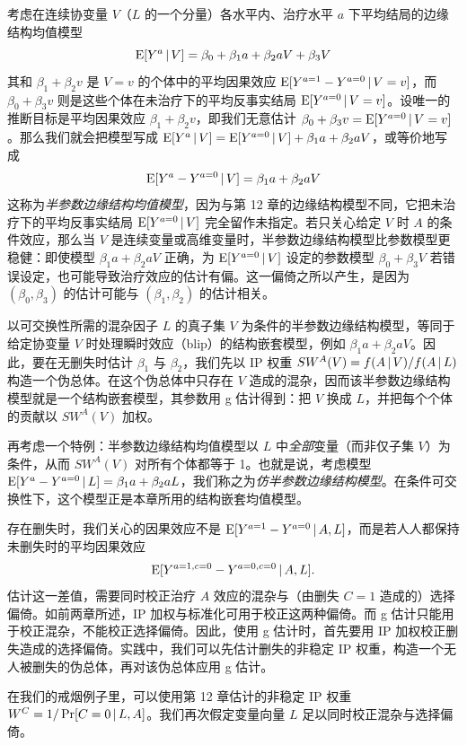 \begin{finepoint}[边缘结构模型与结构嵌套模型的关系]
考虑在连续协变量 $V$（$L$ 的一个分量）各水平内、治疗水平 $a$ 下平均结局的边缘结构均值模型
\[
\mathrm{E}[Y^a\,|\, V]=\beta_0+\beta_1a+\beta_2aV+\beta_3V
\]
其和 $\beta_1+\beta_2v$ 是 $V=v$ 的个体中的平均因果效应 $\mathrm{E}[Y^{a=1}-Y^{a=0}\,|\, V=v]$，而 $\beta_0+\beta_3v$ 则是这些个体在未治疗下的平均反事实结局 $\mathrm{E}[Y^{a=0}\,|\, V=v]$。设唯一的推断目标是平均因果效应 $\beta_1+\beta_2v$，即我们无意估计 $\beta_0+\beta_3v=\mathrm{E}[Y^{a=0}\,|\, V=v]$。那么我们就会把模型写成 $\mathrm{E}[Y^a\,|\, V]=\mathrm{E}[Y^{a=0}\,|\, V]+\beta_1a+\beta_2aV$，或等价地写成
\[
\mathrm{E}[Y^a-Y^{a=0}\,|\, V]=\beta_1a+\beta_2aV
\]
这称为\emph{半参数边缘结构均值模型}，因为与第 12 章的边缘结构模型不同，它把未治疗下的平均反事实结局 $\mathrm{E}[Y^{a=0}\,|\, V]$ 完全留作未指定。若只关心给定 $V$ 时 $A$ 的条件效应，那么当 $V$ 是连续变量或高维变量时，半参数边缘结构模型比参数模型更稳健：即使模型 $\beta_1a+\beta_2aV$ 正确，为 $\mathrm{E}[Y^{a=0}\,|\, V]$ 设定的参数模型 $\beta_0+\beta_3V$ 若错误设定，也可能导致治疗效应的估计有偏。这一偏倚之所以产生，是因为 $(\beta_0,\beta_3)$ 的估计可能与 $(\beta_1,\beta_2)$ 的估计相关。

以可交换性所需的混杂因子 $L$ 的真子集 $V$ 为条件的半参数边缘结构模型，等同于给定协变量 $V$ 时处理瞬时效应（blip）的结构嵌套模型，例如 $\beta_1a+\beta_2aV$。因此，要在无删失时估计 $\beta_1$ 与 $\beta_2$，我们先以 IP 权重 $SW^A(V)=f(A\,|\, V)/f(A\,|\, L)$ 构造一个伪总体。在这个伪总体中只存在 $V$ 造成的混杂，因而该半参数边缘结构模型就是一个结构嵌套模型，其参数用 g 估计得到：把 $V$ 换成 $L$，并把每个个体的贡献以 $SW^A(V)$ 加权。

再考虑一个特例：半参数边缘结构均值模型以 $L$ 中\emph{全部}变量（而非仅子集 $V$）为条件，从而 $SW^A(V)$ 对所有个体都等于 1。也就是说，考虑模型 $\mathrm{E}[Y^a-Y^{a=0}\,|\, L]=\beta_1a+\beta_2aL$，我们称之为\emph{仿半参数边缘结构模型}。在条件可交换性下，这个模型正是本章所用的结构嵌套均值模型。
\end{finepoint}

存在删失时，我们关心的因果效应不是 $\mathrm{E}[Y^{a=1}-Y^{a=0}\,|\, A,L]$，而是若人人都保持未删失时的平均因果效应
\[
\mathrm{E}[Y^{a=1,c=0}-Y^{a=0,c=0}\,|\, A,L].
\]
估计这一差值，需要同时校正治疗 $A$ 效应的混杂与（由删失 $C=1$ 造成的）选择偏倚。如前两章所述，IP 加权与标准化可用于校正这两种偏倚。而 g 估计只能用于校正混杂，不能校正选择偏倚。因此，使用 g 估计时，首先要用 IP 加权校正删失造成的选择偏倚。实践中，我们可以先估计删失的非稳定 IP 权重，构造一个无人被删失的伪总体，再对该伪总体应用 g 估计。

在我们的戒烟例子里，可以使用第 12 章估计的非稳定 IP 权重 $W^C=1/\Pr[C=0\,|\, L,A]$。我们再次假定变量向量 $L$ 足以同时校正混杂与选择偏倚。

